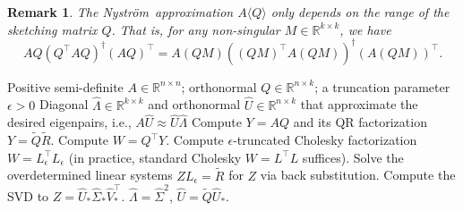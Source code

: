 \documentclass[onefignum,onetabnum]{siamart251216}
\def\Nystrom{Nystr{\"o}m}
\newtheorem{remark}{{\sc Remark}}[section]
\begin{document}
\begin{remark}
    The \Nystrom\ approximation $A \langle Q \rangle$ only depends on the range of the sketching matrix $Q$. That is, for any non-singular $M\in\mathbb{R}^{k\times k}$, we have
    \[
        AQ (Q^\top AQ)^{\dagger} (AQ)^\top = A(QM) \left((QM)^\top A (QM)\right)^{\dagger} \left(A (QM)\right)^\top.
    \]
\end{remark}

\begin{algorithm}
     \small
    \renewcommand{\algorithmicrequire}{\textbf{Input:}}
    \renewcommand{\algorithmicensure}{\textbf{Output:}}
    \caption{\Nystrom\ method}
    \begin{algorithmic}[1]
    \label{alg:Nystrom}
    \REQUIRE Positive semi-definite $A \in \mathbb{R}^{n \times n}$; orthonormal $Q \in \mathbb{R}^{n \times k}$; a truncation parameter $\epsilon > 0$
    \ENSURE Diagonal $\hat{\Lambda} \in \mathbb{R}^{k \times k }$ and orthonormal $\hat{U} \in \mathbb{R}^{n \times k}$ that approximate the desired eigenpairs, i.e., $A\hat{U} \approx \hat{U}\hat{\Lambda}$
    \STATE Compute $Y = AQ$ and its QR factorization $Y = \widetilde{Q}\widetilde{R}$.
    \STATE Compute $W = Q^\top Y$.
    \STATE Compute $\epsilon$-truncated Cholesky factorization $W = L_{\epsilon}^\top L_{\epsilon}$ (in practice, standard Cholesky $W = L^\top L$ suffices).
    \STATE Solve the overdetermined linear systems $Z L_{\epsilon} = \widetilde{R}$ for $Z$ via back substitution.
    \STATE Compute the SVD to $Z = \widehat{U}_{*} \widehat{\Sigma}_* \widehat{V}_{*}^\top$.
    \STATE $\hat{\Lambda} = \widehat{\Sigma}^2$, $\hat{U} = \widetilde{Q}\widehat{U}_{*}$.
    \end{algorithmic} 
\end{algorithm}
\end{document}

